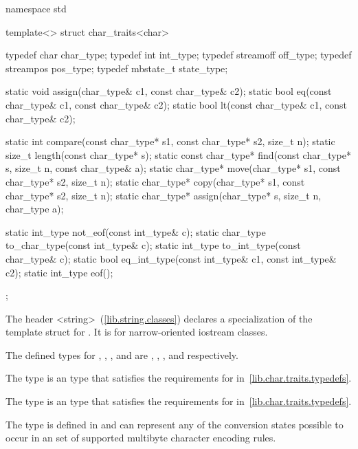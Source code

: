 %
\begin{codeblock}
namespace std {
  template<>
  struct char_traits<char> {
    typedef char        char_type;
    typedef int         int_type;
    typedef streamoff   off_type;
    typedef streampos   pos_type;
    typedef mbstate_t   state_type;

    static void assign(char_type& c1, const char_type& c2);
    static bool eq(const char_type& c1, const char_type& c2);
    static bool lt(const char_type& c1, const char_type& c2);

    static int compare(const char_type* s1, const char_type* s2, size_t n);
    static size_t length(const char_type* s);
    static const char_type* find(const char_type* s, size_t n,
                                 const char_type& a);
    static char_type* move(char_type* s1, const char_type* s2, size_t n);
    static char_type* copy(char_type* s1, const char_type* s2, size_t n);
    static char_type* assign(char_type* s, size_t n, char_type a);

    static int_type not_eof(const int_type& c);
    static char_type to_char_type(const int_type& c);
    static int_type to_int_type(const char_type& c);
    static bool eq_int_type(const int_type& c1, const int_type& c2);
    static int_type eof();
  };
}
\end{codeblock}

\pnum
The header \tcode<string>~(\ref{lib.string.classes}) declares a specialization
of the template struct  for . It is for
narrow-oriented iostream classes.

\pnum
The defined types for
,
,
,
and
are
,
,
,
and
respectively.

\pnum
The type
is an  type that satisfies the requirements for
in~\ref{lib.char.traits.typedefs}.

\pnum
The type
is an  type that satisfies the requirements for
in~\ref{lib.char.traits.typedefs}.

\pnum
The type
is defined in
and can represent any of the conversion states possible to occur in an
 set of supported multibyte
character encoding rules.

